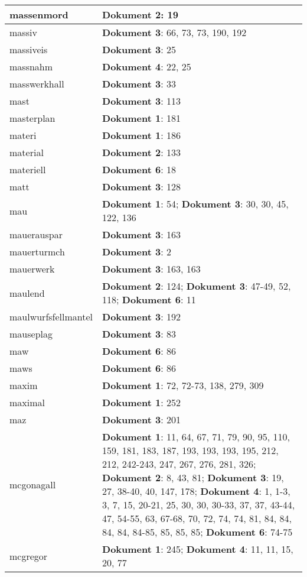 \documentclass[a5paper]{article}
\begin{document}
\begin{longtable}[l]{|l|p{3in}|}
\hline
massenmord & \textbf{Dokument 2}: 19 \\
\hline
massiv & \textbf{Dokument 3}: 66, 73, 73, 190, 192 \\
\hline
massiveis & \textbf{Dokument 3}: 25 \\
\hline
massnahm & \textbf{Dokument 4}: 22, 25 \\
\hline
masswerkhall & \textbf{Dokument 3}: 33 \\
\hline
mast & \textbf{Dokument 3}: 113 \\
\hline
masterplan & \textbf{Dokument 1}: 181 \\
\hline
materi & \textbf{Dokument 1}: 186 \\
\hline
material & \textbf{Dokument 2}: 133 \\
\hline
materiell & \textbf{Dokument 6}: 18 \\
\hline
matt & \textbf{Dokument 3}: 128 \\
\hline
mau & \textbf{Dokument 1}: 54; \textbf{Dokument 3}: 30, 30, 45, 122, 136 \\
\hline
mauerauspar & \textbf{Dokument 3}: 163 \\
\hline
mauerturmch & \textbf{Dokument 3}: 2 \\
\hline
mauerwerk & \textbf{Dokument 3}: 163, 163 \\
\hline
maulend & \textbf{Dokument 2}: 124; \textbf{Dokument 3}: 47-49, 52, 118; \textbf{Dokument 6}: 11 \\
\hline
maulwurfsfellmantel & \textbf{Dokument 3}: 192 \\
\hline
mauseplag & \textbf{Dokument 3}: 83 \\
\hline
maw & \textbf{Dokument 6}: 86 \\
\hline
maws & \textbf{Dokument 6}: 86 \\
\hline
maxim & \textbf{Dokument 1}: 72, 72-73, 138, 279, 309 \\
\hline
maximal & \textbf{Dokument 1}: 252 \\
\hline
maz & \textbf{Dokument 3}: 201 \\
\hline
mcgonagall & \textbf{Dokument 1}: 11, 64, 67, 71, 79, 90, 95, 110, 159, 181, 183, 187, 193, 193, 193, 195, 212, 212, 242-243, 247, 267, 276, 281, 326; \textbf{Dokument 2}: 8, 43, 81; \textbf{Dokument 3}: 19, 27, 38-40, 40, 147, 178; \textbf{Dokument 4}: 1, 1-3, 3, 7, 15, 20-21, 25, 30, 30, 30-33, 37, 37, 43-44, 47, 54-55, 63, 67-68, 70, 72, 74, 74, 81, 84, 84, 84, 84, 84-85, 85, 85, 85; \textbf{Dokument 6}: 74-75 \\
\hline
mcgregor & \textbf{Dokument 1}: 245; \textbf{Dokument 4}: 11, 11, 15, 20, 77 \\

\end{longtable}
\end{document}
